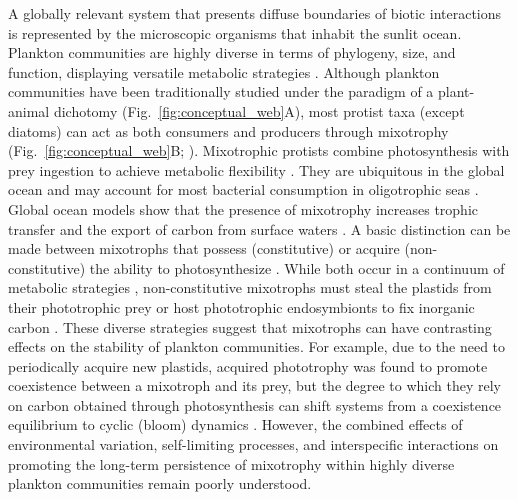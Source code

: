 \documentclass[12pt]{article}
\begin{document}
A globally relevant system that presents diffuse boundaries of biotic interactions is represented by the microscopic organisms that inhabit the sunlit ocean. Plankton communities are highly diverse in terms of phylogeny, size, and function, displaying versatile metabolic strategies \citep{Worden2015}. Although plankton communities have been traditionally studied under the paradigm of a plant-animal dichotomy (Fig.~\ref{fig:conceptual_web}A), most protist taxa (except diatoms) can act as both consumers and producers through mixotrophy (Fig.~\ref{fig:conceptual_web}B; \citep{Stoecker2016,selosse2017}). Mixotrophic protists combine photosynthesis with prey ingestion to achieve metabolic flexibility \citep{Flynn2013,lambert2022}. They are ubiquitous in the global ocean \citep{leles2017oceanic, faure2019mixotrophic,Edwards2019} and may account for most bacterial consumption in oligotrophic seas \citep{hartmann2012mixotrophic}. Global ocean models show that the presence of mixotrophy increases trophic transfer and the export of carbon from surface waters \citep{Ward2016}. A basic distinction can be made between mixotrophs that possess (constitutive) or acquire (non-constitutive) the ability to photosynthesize \citep{Mitra2016}. While both occur in a continuum of metabolic strategies \citep{Stoecker2016,wilken2020contrasting}, non-constitutive mixotrophs must steal the plastids from their phototrophic prey or host phototrophic endosymbionts to fix inorganic carbon \citep{Stoecker2016,johnson2023functional}. These diverse strategies suggest that mixotrophs can have contrasting effects on the stability of plankton communities. For example, due to the need to periodically acquire new plastids, acquired phototrophy was found to promote coexistence between a mixotroph and its prey, but the degree to which they rely on carbon obtained through photosynthesis can shift systems from a coexistence equilibrium to cyclic (bloom) dynamics \citep{Moeller2016}. However, the combined effects of environmental variation, self-limiting processes, and interspecific interactions on promoting the long-term persistence of mixotrophy within highly diverse plankton communities remain poorly understood.
\end{document}
